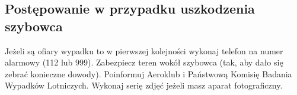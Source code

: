 \documentclass{article}
\begin{document}
\subsection{Postępowanie w przypadku uszkodzenia szybowca}
Jeżeli są ofiary wypadku to w pierwszej kolejności wykonaj telefon na numer
alarmowy (112 lub 999). Zabezpiecz teren wokół szybowca (tak, aby dało się
zebrać konieczne dowody). Poinformuj Aeroklub i Państwową Komisię Badania
Wypadków Lotniczych. Wykonaj serię zdjęć jeżeli masz aparat fotograficzny.
\end{document}
